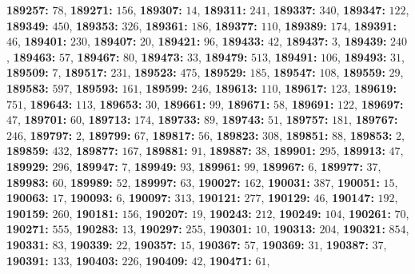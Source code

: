 \textsf{\bfseries 189257:} $78$, \textsf{\bfseries 189271:} $156$, \textsf{\bfseries 189307:} $14$, \textsf{\bfseries 189311:} $241$, \textsf{\bfseries 189337:} $340$, \textsf{\bfseries 189347:} $122$, \textsf{\bfseries 189349:} $450$, \textsf{\bfseries 189353:} $326$, \textsf{\bfseries 189361:} $186$, \textsf{\bfseries 189377:} $110$, \textsf{\bfseries 189389:} $174$, \textsf{\bfseries 189391:} $46$, \textsf{\bfseries 189401:} $230$, \textsf{\bfseries 189407:} $20$, \textsf{\bfseries 189421:} $96$, \textsf{\bfseries 189433:} $42$, \textsf{\bfseries 189437:} $3$, \textsf{\bfseries 189439:} $240$, \textsf{\bfseries 189463:} $57$, \textsf{\bfseries 189467:} $80$, \textsf{\bfseries 189473:} $33$, \textsf{\bfseries 189479:} $513$, \textsf{\bfseries 189491:} $106$, \textsf{\bfseries 189493:} $31$, \textsf{\bfseries 189509:} $7$, \textsf{\bfseries 189517:} $231$, \textsf{\bfseries 189523:} $475$, \textsf{\bfseries 189529:} $185$, \textsf{\bfseries 189547:} $108$, \textsf{\bfseries 189559:} $29$, \textsf{\bfseries 189583:} $597$, \textsf{\bfseries 189593:} $161$, \textsf{\bfseries 189599:} $246$, \textsf{\bfseries 189613:} $110$, \textsf{\bfseries 189617:} $123$, \textsf{\bfseries 189619:} $751$, \textsf{\bfseries 189643:} $113$, \textsf{\bfseries 189653:} $30$, \textsf{\bfseries 189661:} $99$, \textsf{\bfseries 189671:} $58$, \textsf{\bfseries 189691:} $122$, \textsf{\bfseries 189697:} $47$, \textsf{\bfseries 189701:} $60$, \textsf{\bfseries 189713:} $174$, \textsf{\bfseries 189733:} $89$, \textsf{\bfseries 189743:} $51$, \textsf{\bfseries 189757:} $181$, \textsf{\bfseries 189767:} $246$, \textsf{\bfseries 189797:} $2$, \textsf{\bfseries 189799:} $67$, \textsf{\bfseries 189817:} $56$, \textsf{\bfseries 189823:} $308$, \textsf{\bfseries 189851:} $88$, \textsf{\bfseries 189853:} $2$, \textsf{\bfseries 189859:} $432$, \textsf{\bfseries 189877:} $167$, \textsf{\bfseries 189881:} $91$, \textsf{\bfseries 189887:} $38$, \textsf{\bfseries 189901:} $295$, \textsf{\bfseries 189913:} $47$, \textsf{\bfseries 189929:} $296$, \textsf{\bfseries 189947:} $7$, \textsf{\bfseries 189949:} $93$, \textsf{\bfseries 189961:} $99$, \textsf{\bfseries 189967:} $6$, \textsf{\bfseries 189977:} $37$, \textsf{\bfseries 189983:} $60$, \textsf{\bfseries 189989:} $52$, \textsf{\bfseries 189997:} $63$, \textsf{\bfseries 190027:} $162$, \textsf{\bfseries 190031:} $387$, \textsf{\bfseries 190051:} $15$, \textsf{\bfseries 190063:} $17$, \textsf{\bfseries 190093:} $6$, \textsf{\bfseries 190097:} $313$, \textsf{\bfseries 190121:} $277$, \textsf{\bfseries 190129:} $46$, \textsf{\bfseries 190147:} $192$, \textsf{\bfseries 190159:} $260$, \textsf{\bfseries 190181:} $156$, \textsf{\bfseries 190207:} $19$, \textsf{\bfseries 190243:} $212$, \textsf{\bfseries 190249:} $104$, \textsf{\bfseries 190261:} $70$, \textsf{\bfseries 190271:} $555$, \textsf{\bfseries 190283:} $13$, \textsf{\bfseries 190297:} $255$, \textsf{\bfseries 190301:} $10$, \textsf{\bfseries 190313:} $204$, \textsf{\bfseries 190321:} $854$, \textsf{\bfseries 190331:} $83$, \textsf{\bfseries 190339:} $22$, \textsf{\bfseries 190357:} $15$, \textsf{\bfseries 190367:} $57$, \textsf{\bfseries 190369:} $31$, \textsf{\bfseries 190387:} $37$, \textsf{\bfseries 190391:} $133$, \textsf{\bfseries 190403:} $226$, \textsf{\bfseries 190409:} $42$, \textsf{\bfseries 190471:} $61$, 
